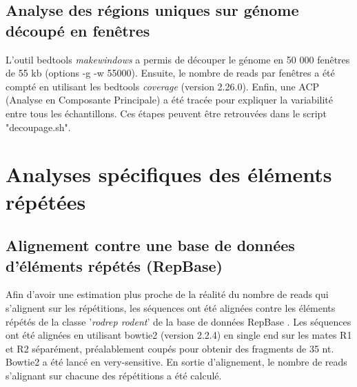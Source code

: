 \documentclass[a4paper,12pt,times]{report}
\begin{document}
      \subsection{Analyse des régions uniques sur génome découpé en fenêtres}
      L'outil  bedtools \textit{makewindows} \cite{bedtools} a permis de découper le génome en 50 000 fenêtres de 55 kb (options -g -w 55000).
      Ensuite, le nombre de reads par fenêtres a été compté en utilisant les bedtools \textit{coverage} (version 2.26.0).
      Enfin, une ACP (Analyse en Composante Principale) a été tracée pour expliquer la variabilité entre tous les échantillons.
\newline Ces étapes peuvent être retrouvées dans le script "decoupage.sh".


    \section{Analyses spécifiques des éléments répétées }
    \subsection{Alignement contre une base de données d'éléments répétés (RepBase)}
 
    Afin d'avoir une estimation plus proche de la réalité du nombre de reads qui s'alignent sur les répétitions, les séquences ont été alignées contre les éléments répétés de la classe '\textit{rodrep rodent}' de la base de données RepBase \cite{repbase}.
    \newline Les séquences ont été alignées en utilisant bowtie2 \cite{bowtie}(version 2.2.4) en single end sur les mates R1 et R2 séparément, préalablement coupés pour obtenir des fragments de 35 nt. Bowtie2 a été lancé en very-sensitive.
    En sortie d'alignement, le nombre de reads s'alignant sur chacune des répétitions a été calculé.
    
\end{document}
